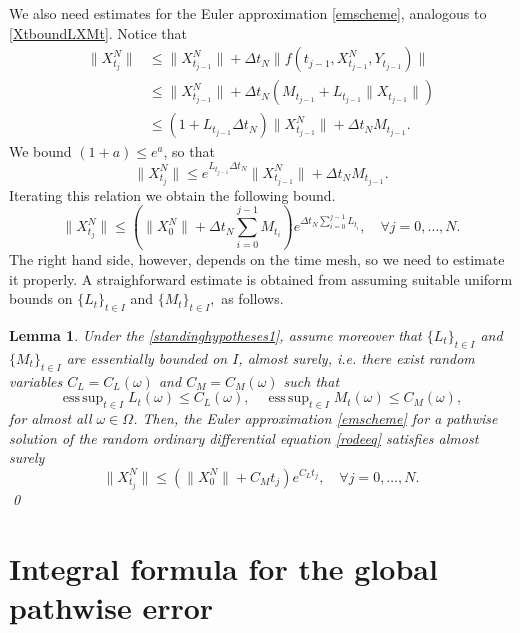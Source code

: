 \documentclass[reqno,12pt]{amsart}
\theoremstyle{plain} %
\newtheorem{lemma}{Lemma}[section]
\theoremstyle{definition} %
\begin{document}
We also need estimates for the Euler approximation \eqref{emscheme}, analogous to \eqref{XtboundLXMt}. Notice that
\begin{align*}
    \|X_{t_j}^N\| & \leq \|X_{t_{j-1}}^N\| + \Delta t_N \|f(t_{j-1}, X_{t_{j-1}}^N, Y_{t_{j-1}})\| \\
    & \leq \|X_{t_{j-1}}^N\| + \Delta t_N (M_{t_{j-1}} + L_{t_{j-1}}\|X_{t_{j-1}}\|) \\
    & \leq \left(1 + L_{t_{j-1}}\Delta t_N\right)\|X_{t_{j-1}}^N\| + \Delta t_N M_{t_{j-1}}.
\end{align*}
We bound $(1 + a) \leq e^a$, so that
\[
    \|X_{t_j}^N\| \leq e^{L_{t_{j-1}}\Delta t_N}\|X_{t_{j-1}}^N\| + \Delta t_N M_{t_{j-1}}.
\]
Iterating this relation we obtain the following bound.
\begin{equation}
    \label{XNtboundLXMtpre}
    \|X_{t_j}^N\| \leq \left(\|X_0^N\| + \Delta t_N \sum_{i=0}^{j-1} M_{t_i}\right)e^{\Delta t_N \sum_{i=0}^{j-1} L_{t_i}}, \quad \forall j = 0, \ldots, N.
\end{equation}
The right hand side, however, depends on the time mesh, so we need to estimate it properly. A straighforward estimate is obtained from assuming suitable uniform bounds on $\{L_t\}_{t\in I}$ and $\{M_t\}_{t\in I},$ as follows.
\begin{lemma}
    \label{lemXNtboundLXMt}
    Under the \cref{standinghypotheses1}, assume moreover that $\{L_t\}_{t\in I}$ and $\{M_t\}_{t\in I}$ are essentially bounded on $I$, almost surely, i.e. there exist random variables $C_L=C_L(\omega)$ and $C_M=C_M(\omega)$ such that
    \begin{equation}
        \label{esssuponLtMt}
        \operatorname{ess\,sup}_{t\in I} L_t(\omega) \leq C_L(\omega), \quad \operatorname{ess\,sup}_{t\in I} M_t(\omega) \leq C_M(\omega),
    \end{equation}
    for almost all $\omega\in\Omega$. Then, the Euler approximation \eqref{emscheme} for a pathwise solution of the random ordinary differential equation \eqref{rodeeq} satisfies almost surely
    \begin{equation}
        \label{XNtboundLXMt}
        \|X_{t_j}^N\| \leq \left(\|X_0^N\| + C_M t_j \right)e^{C_L t_j}, \quad \forall j = 0, \ldots, N.
    \end{equation}
    \qed
\end{lemma}

\section{Integral formula for the global pathwise error}
\end{document}
